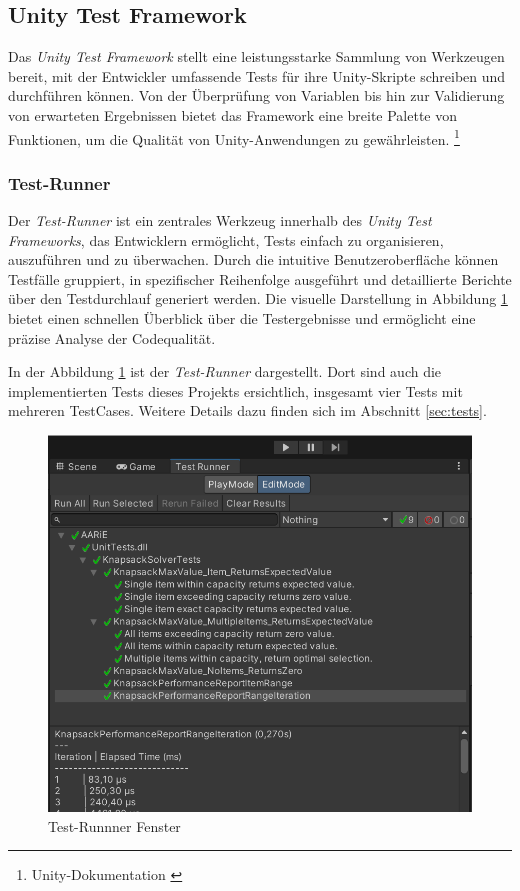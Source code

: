 \subsection{\label{sec:testFramework}Unity Test Framework}

Das \textit{Unity Test Framework} stellt eine leistungsstarke Sammlung von Werkzeugen bereit, mit der Entwickler umfassende Tests für ihre Unity-Skripte schreiben und durchführen können. Von der Überprüfung von Variablen bis hin zur Validierung von erwarteten
Ergebnissen bietet das Framework eine breite Palette von Funktionen, um die Qualität von Unity-Anwendungen zu gewährleisten. \footnote{Unity-Dokumentation \cite{UnityTestFramework}}

\subsubsection{\label{sec:testRunner}Test-Runner}

Der \textit{Test-Runner} ist ein zentrales Werkzeug innerhalb des \textit{Unity Test Frameworks}, das Entwicklern ermöglicht, Tests einfach zu organisieren, auszuführen und zu überwachen. Durch die intuitive Benutzeroberfläche können Testfälle gruppiert, in spezifischer Reihenfolge ausgeführt und detaillierte Berichte über den Testdurchlauf generiert werden. Die visuelle Darstellung in Abbildung \ref{fig:testRunner} bietet einen schnellen Überblick über die Testergebnisse und ermöglicht eine präzise Analyse der Codequalität.

In der Abbildung \ref{fig:testRunner} ist der \textit{Test-Runner} dargestellt. Dort sind auch die implementierten Tests dieses Projekts ersichtlich, insgesamt vier Tests mit mehreren TestCases. Weitere Details dazu finden sich im Abschnitt \ref{sec:tests}.

\begin{figure}[H]
\centering
\includegraphics[scale=0.5, angle=0]{images/testRunner}
\caption{Test-Runnner Fenster}
\label{fig:testRunner}
\end{figure}

